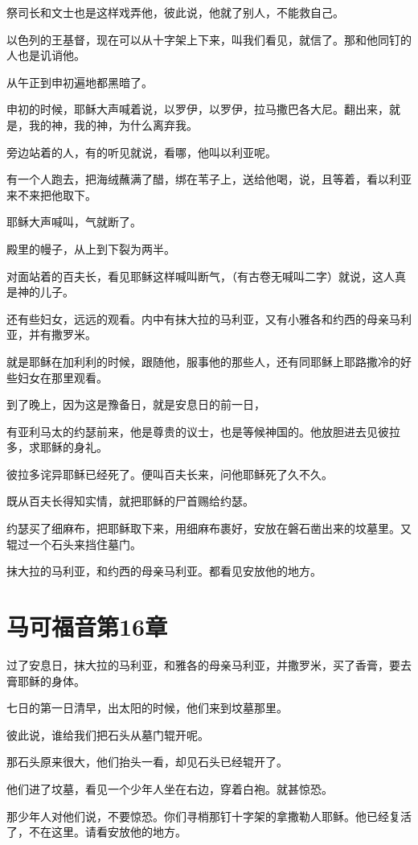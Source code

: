 \documentclass[12pt,oneside]{book}
\begin{document}
祭司长和文士也是这样戏弄他，彼此说，他就了别人，不能救自己。

以色列的王基督，现在可以从十字架上下来，叫我们看见，就信了。那和他同钉的人也是讥诮他。

从午正到申初遍地都黑暗了。

申初的时候，耶稣大声喊着说，以罗伊，以罗伊，拉马撒巴各大尼。翻出来，就是，我的神，我的神，为什么离弃我。

旁边站着的人，有的听见就说，看哪，他叫以利亚呢。

有一个人跑去，把海绒蘸满了醋，绑在苇子上，送给他喝，说，且等着，看以利亚来不来把他取下。

耶稣大声喊叫，气就断了。

殿里的幔子，从上到下裂为两半。

对面站着的百夫长，看见耶稣这样喊叫断气，（有古卷无喊叫二字）就说，这人真是神的儿子。

还有些妇女，远远的观看。内中有抹大拉的马利亚，又有小雅各和约西的母亲马利亚，并有撒罗米。

就是耶稣在加利利的时候，跟随他，服事他的那些人，还有同耶稣上耶路撒冷的好些妇女在那里观看。

到了晚上，因为这是豫备日，就是安息日的前一日，

有亚利马太的约瑟前来，他是尊贵的议士，也是等候神国的。他放胆进去见彼拉多，求耶稣的身礼。

彼拉多诧异耶稣已经死了。便叫百夫长来，问他耶稣死了久不久。

既从百夫长得知实情，就把耶稣的尸首赐给约瑟。

约瑟买了细麻布，把耶稣取下来，用细麻布裹好，安放在磐石凿出来的坟墓里。又辊过一个石头来挡住墓门。

抹大拉的马利亚，和约西的母亲马利亚。都看见安放他的地方。

\chapter{马可福音第16章}
过了安息日，抹大拉的马利亚，和雅各的母亲马利亚，并撒罗米，买了香膏，要去膏耶稣的身体。

七日的第一日清早，出太阳的时候，他们来到坟墓那里。

彼此说，谁给我们把石头从墓门辊开呢。

那石头原来很大，他们抬头一看，却见石头已经辊开了。

他们进了坟墓，看见一个少年人坐在右边，穿着白袍。就甚惊恐。

那少年人对他们说，不要惊恐。你们寻梢那钉十字架的拿撒勒人耶稣。他已经复活了，不在这里。请看安放他的地方。
\end{document}
